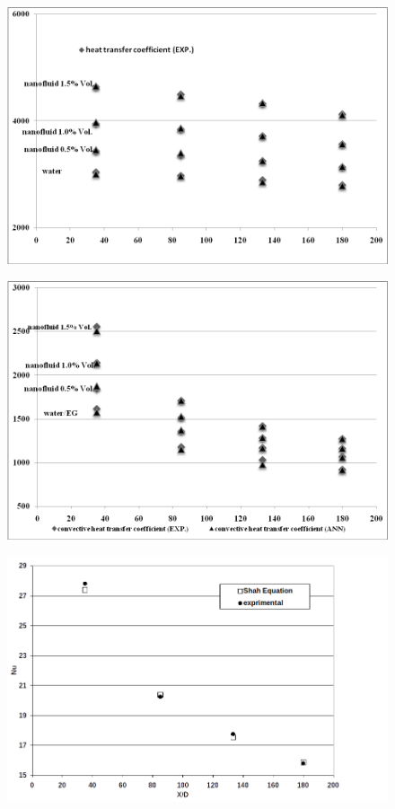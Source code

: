 \documentclass{article}
\begin{document}
\begin{figure}
	\centering
	\includegraphics[width=0.7\linewidth]{fig5}
	\caption{}
	\label{fig:fig5}
\end{figure}

\begin{figure}
	\centering
	\includegraphics[width=0.8\linewidth]{fig8}
	\caption{}
	\label{fig:fig8}
\end{figure}


\begin{figure}
	\centering
	\includegraphics[width=0.9\linewidth]{fig6}
	\caption{}
	\label{fig:fig6}
\end{figure}
\end{document}
